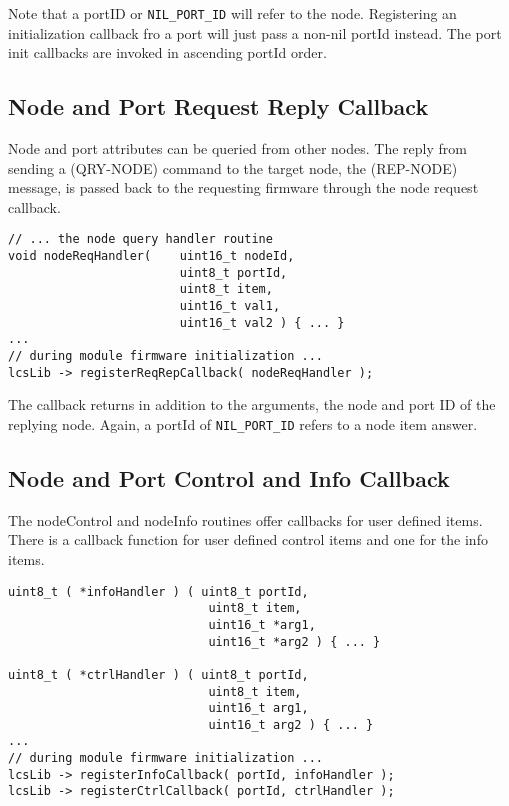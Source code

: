 Note that a portID or \texttt{NIL\_PORT\_ID} will refer to the node. Registering an initialization callback fro a port will just pass a non-nil portId instead. The port init callbacks are invoked in ascending portId order.

\subsection{Node and Port Request Reply Callback}

Node and port attributes can be queried from other nodes. The reply from sending a (QRY-NODE) command to the target node, the (REP-NODE) message, is passed back to the requesting firmware through the node request callback.

\lstset{style=codesnippetstyle}
\begin{lstlisting}
// ... the node query handler routine
void nodeReqHandler(    uint16_t nodeId, 
                        uint8_t portId, 
                        uint8_t item, 
                        uint16_t val1, 
                        uint16_t val2 ) { ... }
...
// during module firmware initialization ...
lcsLib -> registerReqRepCallback( nodeReqHandler );
\end{lstlisting}

The callback returns in addition to the arguments, the node and port ID of the replying node. Again, a portId of \texttt{NIL\_PORT\_ID} refers to a node item answer.

\subsection{Node and Port Control and Info Callback}

The nodeControl and nodeInfo routines offer callbacks for user defined items. There is a callback function for user defined control items and one for the info items.

\lstset{style=codesnippetstyle}
\begin{lstlisting}
uint8_t ( *infoHandler ) ( uint8_t portId, 
                            uint8_t item, 
                            uint16_t *arg1, 
                            uint16_t *arg2 ) { ... }

uint8_t ( *ctrlHandler ) ( uint8_t portId, 
                            uint8_t item, 
                            uint16_t arg1, 
                            uint16_t arg2 ) { ... }
...
// during module firmware initialization ...
lcsLib -> registerInfoCallback( portId, infoHandler );
lcsLib -> registerCtrlCallback( portId, ctrlHandler );
\end{lstlisting}

